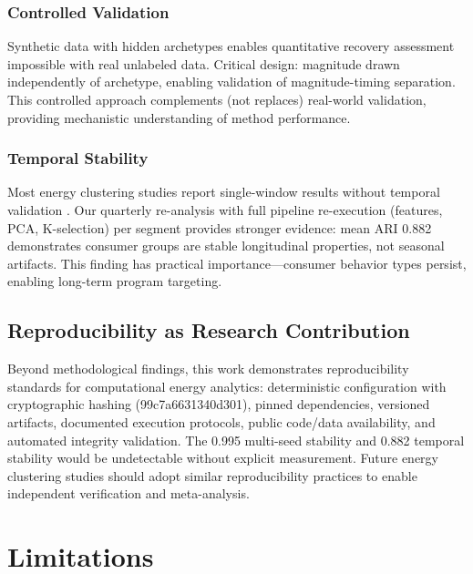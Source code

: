 \documentclass[11pt,a4paper]{article}
\begin{document}
\subsubsection{Controlled Validation}

Synthetic data with hidden archetypes enables quantitative recovery assessment impossible with real unlabeled data. Critical design: magnitude drawn independently of archetype, enabling validation of magnitude-timing separation. This controlled approach complements (not replaces) real-world validation, providing mechanistic understanding of method performance.

\subsubsection{Temporal Stability}

Most energy clustering studies report single-window results without temporal validation \cite{kwac2014household,rhodes2014clustering}. Our quarterly re-analysis with full pipeline re-execution (features, PCA, K-selection) per segment provides stronger evidence: mean ARI 0.882 demonstrates consumer groups are stable longitudinal properties, not seasonal artifacts. This finding has practical importance---consumer behavior types persist, enabling long-term program targeting.

\subsection{Reproducibility as Research Contribution}

Beyond methodological findings, this work demonstrates reproducibility standards for computational energy analytics: deterministic configuration with cryptographic hashing (99c7a6631340d301), pinned dependencies, versioned artifacts, documented execution protocols, public code/data availability, and automated integrity validation. The 0.995 multi-seed stability and 0.882 temporal stability would be undetectable without explicit measurement. Future energy clustering studies should adopt similar reproducibility practices to enable independent verification and meta-analysis.

\section{Limitations}
\label{sec:limitations}
\end{document}
